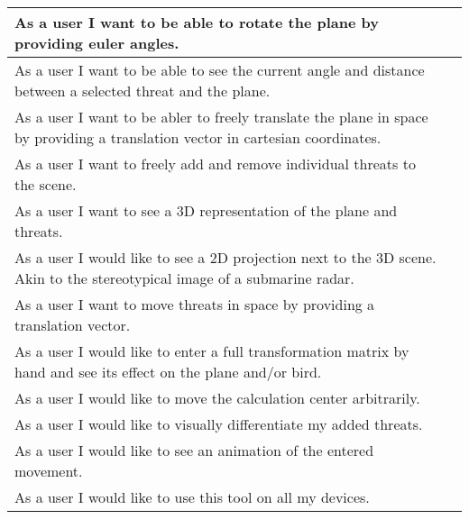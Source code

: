 \begin{xltabular}{\textwidth}{|X|M{3cm}|}
\hline 
 \endlastfoot 
As a user I want to be able to rotate the plane by providing euler angles. &  \\ \hline 
  As a user I want to be able to see the current angle and distance between a selected threat and the plane. &  \\ \hline 
  As a user I want to be abler to freely translate the plane in space by providing a translation vector in cartesian coordinates. &  \\ \hline 
  As a user I want to freely add and remove individual threats to the scene. &  \\ \hline 
  As a user I want to see a 3D representation of the plane and threats. &  \\ \hline 
  As a user I would like to see a 2D projection next to the 3D scene. Akin to the stereotypical image of a submarine radar. &  \\ \hline 
  As a user I want to move threats in space by providing a translation vector. &  \\ \hline 
  As a user I would like to enter a full transformation matrix by hand and see its effect on the plane and/or bird. &  \\ \hline 
  As a user I would like to move the calculation center arbitrarily. &  \\ \hline 
  As a user I would like to visually differentiate my added threats. &  \\ \hline 
  As a user I would like to see an animation of the entered movement. &  \\ \hline 
  As a user I would like to use this tool on all my devices. &  \\ \hline 
  
\end{xltabular} 
 \egroup 
 \color{default}